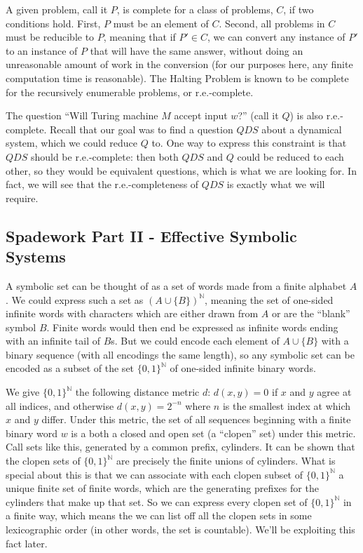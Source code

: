 \documentclass{fkpaper}
\renewcommand{\Nn}{\mathbb{N}}
\begin{document}
\begin{multicols}{2}
A given problem, call it $P$, is complete for a class of problems,
$C$, if two conditions hold. First, $P$ must be an element of $C$.
Second, all problems in $C$ must be reducible to $P$, meaning that if
$P' \in C$, we can convert any instance of $P'$ to an instance of $P$
that will have the same answer, without doing an unreasonable amount
of work in the conversion (for our purposes here, any finite
computation time is reasonable). The Halting Problem is known to be
complete for the recursively enumerable problems, or r.e.-complete.

The question ``Will Turing machine $M$ accept input $w$?'' (call it
$Q$) is also r.e.-complete. Recall that our goal was to find a
question $QDS$ about a dynamical system, which we could reduce $Q$ to.
One way to express this constraint is that $QDS$ should be
r.e.-complete: then both $QDS$ and $Q$ could be reduced to each other,
so they would be equivalent questions, which is what we are looking
for. In fact, we will see that the r.e.-completeness of $QDS$ is
exactly what we will require.

\subsection{Spadework Part II - Effective Symbolic Systems}

A symbolic set can be thought of as a set of words made from a finite alphabet $A$. We could express such a set as $(A \cup \{B\})^\Nn$, meaning the set of one-sided infinite words with characters which are either drawn from $A$ or are the ``blank'' symbol $B$. Finite words would then end be expressed as infinite words ending with an infinite tail of $B$s. But we could encode each element of $A \cup \{B\}$ with a binary sequence (with all encodings the same length), so any symbolic set can be encoded as a subset of the set $\{0,1\}^\Nn$ of one-sided infinite binary words.

We give $\{0,1\}^\Nn$ the following distance metric $d$: $d(x,y) = 0$ if $x$ and $y$ agree at all indices, and otherwise $d(x,y) = 2^{-n}$ where $n$ is the smallest index at which $x$ and $y$ differ. Under this metric, the set of all sequences beginning with a finite binary word $w$ is a both a closed and open set (a ``clopen'' set) under this metric. Call sets like this, generated by a common prefix, cylinders. It can be shown that the clopen sets of $\{0,1\}^\Nn$ are precisely the finite unions of cylinders. What is special about this is that we can associate with each clopen subset of $\{0,1\}^\Nn$ a unique finite set of finite words, which are the generating prefixes for the cylinders that make up that set. So we can express every clopen set of $\{0,1\}^\Nn$ in a finite way, which means the we can list off all the clopen sets in some lexicographic order (in other words, the set is countable). We'll be exploiting this fact later.


\end{multicols}
\end{document}
